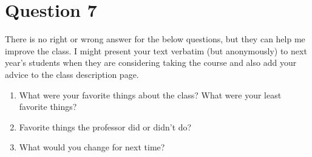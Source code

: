 \documentclass[10pt]{article}
\begin{document}
\newpage
\section{Question 7}


There is no right or wrong answer for the below questions, but they can help me improve the class. 
I might present your text verbatim (but anonymously) to next year's students when they are considering taking the course and also add your advice to the class description page.

\begin{enumerate}
\item What were your favorite things about the class? What were your least favorite things?
\item Favorite things the professor did or didn't do?
\item What would you change for next time?
\end{enumerate}
\end{document}
